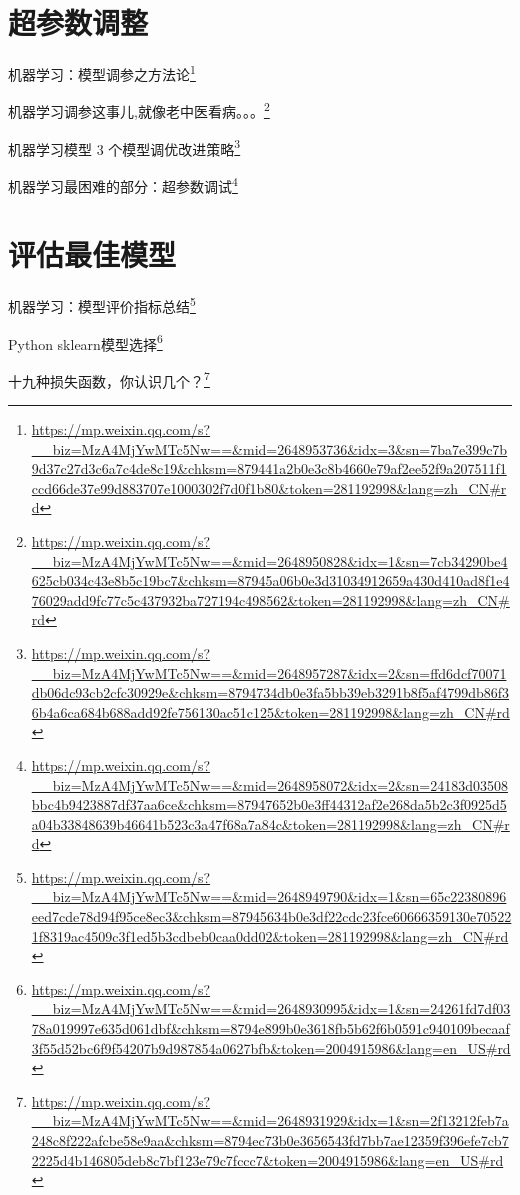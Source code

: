 \documentclass[]{ctexbook}
\renewcommand{\href}[2]{#2\footnote{\url{#1}}}
\begin{document}
\hypertarget{ux8d85ux53c2ux6570ux8c03ux6574}{%
\section{超参数调整}\label{ux8d85ux53c2ux6570ux8c03ux6574}}

\href{https://mp.weixin.qq.com/s?__biz=MzA4MjYwMTc5Nw==\&mid=2648953736\&idx=3\&sn=7ba7e399c7b9d37c27d3c6a7c4de8c19\&chksm=879441a2b0e3c8b4660e79af2ee52f9a207511f1ccd66de37e99d883707e1000302f7d0f1b80\&token=281192998\&lang=zh_CN\#rd}{机器学习：模型调参之方法论}

\href{https://mp.weixin.qq.com/s?__biz=MzA4MjYwMTc5Nw==\&mid=2648950828\&idx=1\&sn=7cb34290be4625cb034c43e8b5c19bc7\&chksm=87945a06b0e3d31034912659a430d410ad8f1e476029add9fc77c5c437932ba727194c498562\&token=281192998\&lang=zh_CN\#rd}{机器学习调参这事儿,就像老中医看病。。。}

\href{https://mp.weixin.qq.com/s?__biz=MzA4MjYwMTc5Nw==\&mid=2648957287\&idx=2\&sn=ffd6dcf70071db06dc93cb2cfc30929e\&chksm=8794734db0e3fa5bb39eb3291b8f5af4799db86f36b4a6ca684b688add92fe756130ac51c125\&token=281192998\&lang=zh_CN\#rd}{机器学习模型 3 个模型调优改进策略}

\href{https://mp.weixin.qq.com/s?__biz=MzA4MjYwMTc5Nw==\&mid=2648958072\&idx=2\&sn=24183d03508bbc4b9423887df37aa6ce\&chksm=87947652b0e3ff44312af2e268da5b2c3f0925d5a04b33848639b46641b523c3a47f68a7a84c\&token=281192998\&lang=zh_CN\#rd}{机器学习最困难的部分：超参数调试}

\hypertarget{ux8bc4ux4f30ux6700ux4f73ux6a21ux578b}{%
\section{评估最佳模型}\label{ux8bc4ux4f30ux6700ux4f73ux6a21ux578b}}

\href{https://mp.weixin.qq.com/s?__biz=MzA4MjYwMTc5Nw==\&mid=2648949790\&idx=1\&sn=65c22380896eed7cde78d94f95ce8ec3\&chksm=87945634b0e3df22cdc23fce60666359130e705221f8319ac4509c3f1ed5b3cdbeb0caa0dd02\&token=281192998\&lang=zh_CN\#rd}{机器学习：模型评价指标总结}

\href{https://mp.weixin.qq.com/s?__biz=MzA4MjYwMTc5Nw==\&mid=2648930995\&idx=1\&sn=24261fd7df0378a019997e635d061dbf\&chksm=8794e899b0e3618fb5b62f6b0591c940109becaaf3f55d52bc6f9f54207b9d987854a0627bfb\&token=2004915986\&lang=en_US\#rd}{Python sklearn模型选择}

\href{https://mp.weixin.qq.com/s?__biz=MzA4MjYwMTc5Nw==\&mid=2648931929\&idx=1\&sn=2f13212feb7a248c8f222afcbe58e9aa\&chksm=8794ec73b0e3656543fd7bb7ae12359f396efe7cb72225d4b146805deb8c7bf123e79c7fccc7\&token=2004915986\&lang=en_US\#rd}{十九种损失函数，你认识几个？}
\end{document}
